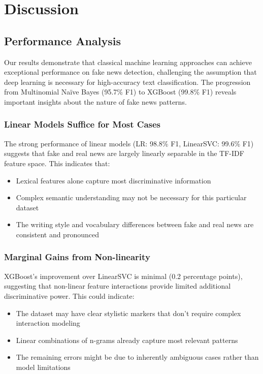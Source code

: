 \documentclass[11pt]{article}
\begin{document}
\section{Discussion}

\subsection{Performance Analysis}
Our results demonstrate that classical machine learning approaches can achieve exceptional performance on fake news detection, challenging the assumption that deep learning is necessary for high-accuracy text classification. The progression from Multinomial Naïve Bayes (95.7\% F1) to XGBoost (99.8\% F1) reveals important insights about the nature of fake news patterns.

\subsubsection{Linear Models Suffice for Most Cases}
The strong performance of linear models (LR: 98.8\% F1, LinearSVC: 99.6\% F1) suggests that fake and real news are largely linearly separable in the TF-IDF feature space. This indicates that:
\begin{itemize}
\item Lexical features alone capture most discriminative information
\item Complex semantic understanding may not be necessary for this particular dataset
\item The writing style and vocabulary differences between fake and real news are consistent and pronounced
\end{itemize}

\subsubsection{Marginal Gains from Non-linearity}
XGBoost's improvement over LinearSVC is minimal (0.2 percentage points), suggesting that non-linear feature interactions provide limited additional discriminative power. This could indicate:
\begin{itemize}
\item The dataset may have clear stylistic markers that don't require complex interaction modeling
\item Linear combinations of n-grams already capture most relevant patterns
\item The remaining errors might be due to inherently ambiguous cases rather than model limitations
\end{itemize}
\end{document}
